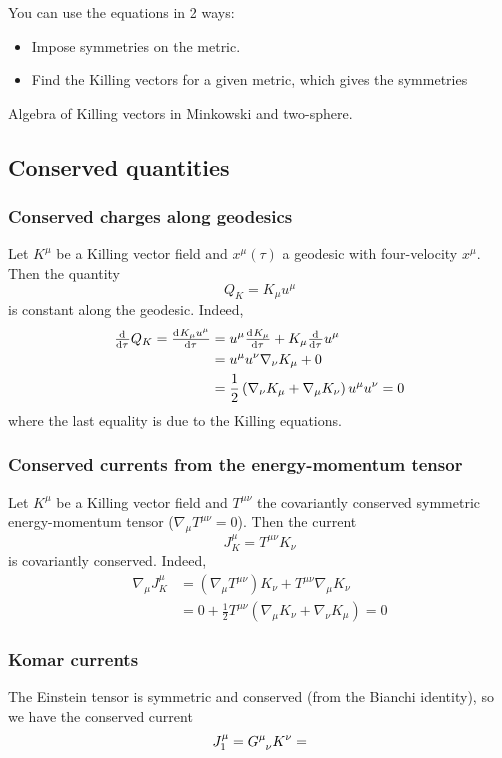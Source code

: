 You can use the equations in 2 ways:
\begin{itemize}
\item Impose symmetries on the metric.
\item Find the Killing vectors for a given metric, which gives the symmetries
\end{itemize}

\begin{example}
Algebra of Killing vectors in Minkowski and two-sphere.
\end{example}

\subsection{Conserved quantities}
\subsubsection{Conserved charges along geodesics}
Let $K^\mu$ be a Killing vector field and $x^\mu(\tau)$ a geodesic with four-velocity $x^\mu$. Then the quantity
\[ Q_K = K_\mu u^\mu \]
is constant along the geodesic. Indeed,
\begin{align}
\od{}{\tau}Q_K = \od{K_\mu u^\mu}{\tau} &= u^\mu \od{K_\mu}{\tau} + K_\mu \od{}{\tau}u^\mu \\
&= u^\mu u^\nu \nabla_\nu K_\mu + 0\\
&= \frac{1}{2}\left(\nabla_\nu K_\mu + \nabla_\mu K_\nu\right)u^\mu u^\nu = 0
\end{align}
where the last equality is due to the Killing equations.

\subsubsection{Conserved currents from the energy-momentum tensor}
Let $K^\mu$ be a Killing vector field and $T^{\mu\nu}$ the covariantly conserved symmetric energy-momentum tensor ($\nabla_\mu T^{\mu\nu} = 0$). Then the current
\[ J_K^\mu = T^{\mu\nu}K_\nu \]
is covariantly conserved. Indeed,
\begin{align}
\nabla_\mu J^\mu_K &= (\nabla_\mu T^{\mu\nu})K_\nu + T^{\mu\nu} \nabla_\mu K_\nu \\
&= 0 + \frac{1}{2}T^{\mu\nu}\left(\nabla_\mu K_\nu + \nabla_\nu K_\mu\right) = 0
\end{align}

\subsubsection{Komar currents}
The Einstein tensor is symmetric and conserved (from the Bianchi identity), so we have the conserved current
\[ J^\mu_1 = \tensor{G}{^\mu_\nu}K^\nu =  \]

